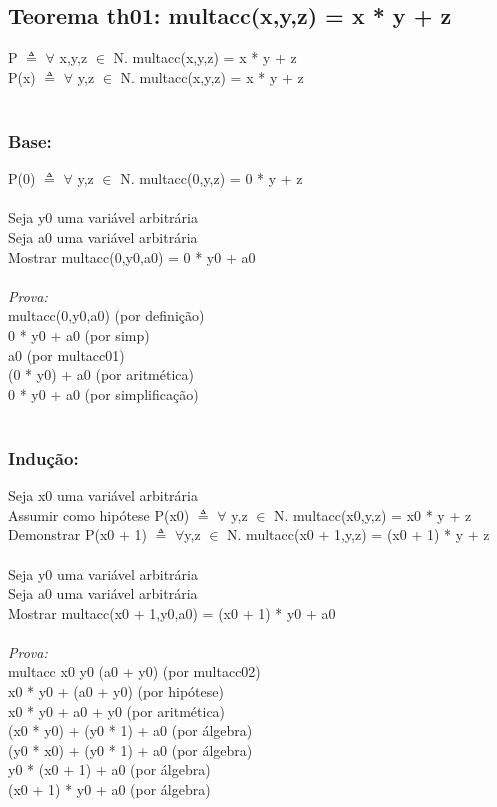\documentclass{article}
\begin{document}
\subsection{Teorema th01: multacc(x,y,z) = x * y + z}
P $\triangleq$ $\forall$ x,y,z $\in$ N. multacc(x,y,z) = x * y + z
\\P(x) $\triangleq$ $\forall$ y,z $\in$ N. multacc(x,y,z) = x * y + z
\\
\\\subsubsection{Base:} P(0) $\triangleq$ $\forall$ y,z $\in$ N. multacc(0,y,z) = 0 * y + z
\\
\\Seja y0 uma variável arbitrária 
\\Seja a0 uma variável arbitrária 
\\Mostrar multacc(0,y0,a0) = 0 * y0 + a0
\\
\\\textit{Prova:}
\\multacc(0,y0,a0) (por definição)
\\0 * y0 + a0 (por simp)
\\a0 (por multacc01)
\\(0 * y0) + a0 (por aritmética)
\\0 * y0 + a0 (por simplificação)
\\
\\\subsubsection{Indução:}
Seja x0 uma variável arbitrária
\\Assumir como hipótese P(x0) $\triangleq$ $\forall$ y,z $\in$ N. multacc(x0,y,z) = x0 * y + z
\\Demonstrar P(x0 + 1) $\triangleq$ $\forall$y,z $\in$ N. multacc(x0 + 1,y,z) = (x0 + 1) * y + z
\\
\\Seja y0 uma variável arbitrária 
\\Seja a0 uma variável arbitrária 
\\Mostrar multacc(x0 + 1,y0,a0) = (x0 + 1) * y0 + a0
\\
\\\textit{Prova:}
\\multacc x0 y0 (a0 + y0) (por multacc02)
\\x0 * y0 + (a0 + y0) (por hipótese) 
\\x0 * y0 + a0 + y0 (por aritmética)
\\(x0 * y0) + (y0 * 1) + a0 (por álgebra)
\\(y0 * x0) + (y0 * 1) + a0 (por álgebra)
\\y0 * (x0 + 1) + a0 (por álgebra)
\\(x0 + 1) * y0 + a0 (por álgebra)
\end{document}
